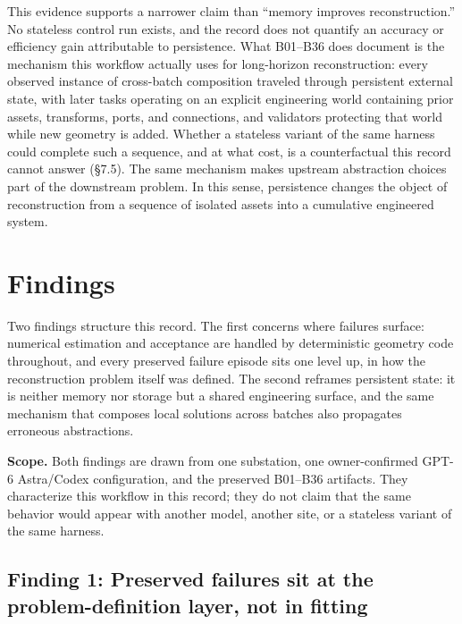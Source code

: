 \documentclass[10pt,a4paper]{article}
\begin{document}
This evidence supports a narrower claim than ``memory improves
reconstruction.'' No stateless control run exists, and the record does
not quantify an accuracy or efficiency gain attributable to persistence.
What B01--B36 does document is the mechanism this workflow actually uses
for long-horizon reconstruction: every observed instance of cross-batch
composition traveled through persistent external state, with later tasks
operating on an explicit engineering world containing prior assets,
transforms, ports, and connections, and validators protecting that world
while new geometry is added. Whether a stateless variant of the same
harness could complete such a sequence, and at what cost, is a
counterfactual this record cannot answer (§7.5). The same mechanism
makes upstream abstraction choices part of the downstream problem. In
this sense, persistence changes the object of reconstruction from a
sequence of isolated assets into a cumulative engineered system.

\hypertarget{findings}{%
\section{Findings}\label{findings}}

Two findings structure this record. The first concerns where failures
surface: numerical estimation and acceptance are handled by
deterministic geometry code throughout, and every preserved failure
episode sits one level up, in how the reconstruction problem itself was
defined. The second reframes persistent state: it is neither memory nor
storage but a shared engineering surface, and the same mechanism that
composes local solutions across batches also propagates erroneous
abstractions.

\textbf{Scope.} Both findings are drawn from one substation, one
owner-confirmed GPT-6 Astra/Codex configuration, and the preserved
B01--B36 artifacts. They characterize this workflow in this record; they
do not claim that the same behavior would appear with another model,
another site, or a stateless variant of the same harness.

\hypertarget{finding-1-preserved-failures-sit-at-the-problem-definition-layer-not-in-fitting}{%
\subsection{Finding 1: Preserved failures sit at the problem-definition
layer, not in
fitting}\label{finding-1-preserved-failures-sit-at-the-problem-definition-layer-not-in-fitting}}
\end{document}
